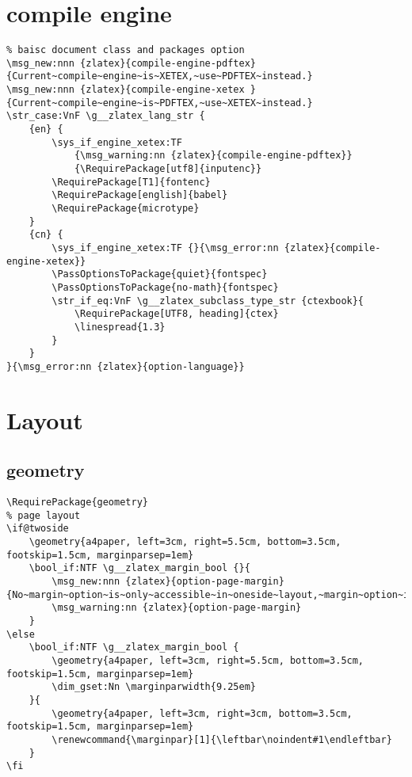 \section{compile engine}
\begin{verbatim}
% baisc document class and packages option
\msg_new:nnn {zlatex}{compile-engine-pdftex}{Current~compile~engine~is~XETEX,~use~PDFTEX~instead.}
\msg_new:nnn {zlatex}{compile-engine-xetex }{Current~compile~engine~is~PDFTEX,~use~XETEX~instead.}
\str_case:VnF \g__zlatex_lang_str {
    {en} { 
        \sys_if_engine_xetex:TF 
            {\msg_warning:nn {zlatex}{compile-engine-pdftex}}
            {\RequirePackage[utf8]{inputenc}}
        \RequirePackage[T1]{fontenc}
        \RequirePackage[english]{babel}
        \RequirePackage{microtype}
    }
    {cn} {
        \sys_if_engine_xetex:TF {}{\msg_error:nn {zlatex}{compile-engine-xetex}}
        \PassOptionsToPackage{quiet}{fontspec}
        \PassOptionsToPackage{no-math}{fontspec}
        \str_if_eq:VnF \g__zlatex_subclass_type_str {ctexbook}{
            \RequirePackage[UTF8, heading]{ctex}
            \linespread{1.3}
        }
    }
}{\msg_error:nn {zlatex}{option-language}}   
\end{verbatim}

\section{Layout}
\subsection{geometry}
\begin{verbatim}
\RequirePackage{geometry}
% page layout 
\if@twoside 
    \geometry{a4paper, left=3cm, right=5.5cm, bottom=3.5cm, footskip=1.5cm, marginparsep=1em}
    \bool_if:NTF \g__zlatex_margin_bool {}{
        \msg_new:nnn {zlatex}{option-page-margin}{No~margin~option~is~only~accessible~in~oneside~layout,~margin~option~is~now~enabled~by~default.} 
        \msg_warning:nn {zlatex}{option-page-margin}
    }
\else 
    \bool_if:NTF \g__zlatex_margin_bool {
        \geometry{a4paper, left=3cm, right=5.5cm, bottom=3.5cm, footskip=1.5cm, marginparsep=1em}
        \dim_gset:Nn \marginparwidth{9.25em}
    }{
        \geometry{a4paper, left=3cm, right=3cm, bottom=3.5cm, footskip=1.5cm, marginparsep=1em}
        \renewcommand{\marginpar}[1]{\leftbar\noindent#1\endleftbar}
    }
\fi
\end{verbatim}

